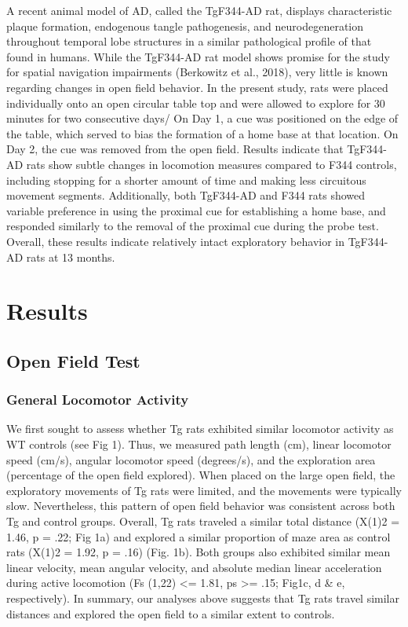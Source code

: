 \documentclass[fleqn,10pt]{wlscirep}
\begin{document}
A recent animal model of AD, called the TgF344-AD rat, displays characteristic plaque formation, endogenous tangle pathogenesis, and neurodegeneration throughout temporal lobe structures in a similar pathological profile of that found in humans. While the TgF344-AD rat model shows promise for the study for spatial navigation impairments (Berkowitz et al., 2018), very little is known regarding changes in open field behavior. In the present study, rats were placed individually onto an open circular table top and were allowed to explore for 30 minutes for two consecutive days/ On Day 1, a cue was positioned on the edge of the table, which served to bias the formation of a home base at that location. On Day 2, the cue was removed from the open field. Results indicate that TgF344-AD rats show subtle changes in locomotion measures compared to F344 controls, including stopping for a shorter amount of time and making less circuitous movement segments. Additionally, both TgF344-AD and F344 rats showed variable preference in using the proximal cue for establishing a home base, and responded similarly to the removal of the proximal cue during the probe test. Overall, these results indicate relatively intact exploratory behavior in TgF344-AD rats at 13 months.   

\section*{Results}

\subsection*{Open Field Test}

\subsubsection*{General Locomotor Activity}
We first sought to assess whether Tg rats exhibited similar locomotor activity as WT controls (see Fig 1). Thus, we measured path length (cm), linear locomotor speed (cm/s), angular locomotor speed (degrees/s), and the exploration area (percentage of the open field explored). When placed on the large open field, the exploratory movements of Tg rats were limited, and the movements were typically slow. Nevertheless, this pattern of open field behavior was consistent across both Tg and control groups. Overall, Tg rats traveled a similar total distance (X(1)2 = 1.46, p = .22; Fig 1a) and explored a similar proportion of maze area as control rats (X(1)2 = 1.92, p = .16) (Fig. 1b). Both groups also exhibited similar mean linear velocity, mean angular velocity, and absolute median linear acceleration during active locomotion (Fs (1,22) <= 1.81, ps >= .15; Fig1c, d \& e, respectively). In summary, our analyses above suggests that Tg rats travel similar distances and explored the open field to a similar extent to controls.  
\end{document}
